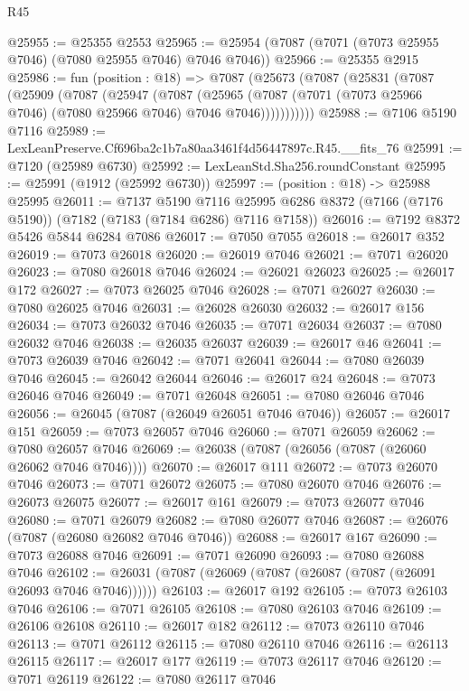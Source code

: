 \begin{lexlean}{R45}
\begin{coremodule}
{@25955 := @25355 @2553
@25965 := @25954 (@7087 (@7071 (@7073 @25955 @7046) (@7080 @25955 @7046) @7046 @7046))
@25966 := @25355 @2915
@25986 := fun (position : @18) =>
  @7087
    (@25673
      (@7087
        (@25831
          (@7087
            (@25909
              (@7087
                (@25947
                  (@7087
                    (@25965
                      (@7087 (@7071 (@7073 @25966 @7046) (@7080 @25966 @7046) @7046 @7046)))))))))))
@25988 := @7106 @5190 @7116
@25989 := LexLeanPreserve.Cf696ba2c1b7a80aa3461f4d56447897c.R45.__fits_76
@25991 := @7120 (@25989 @6730)
@25992 := LexLeanStd.Sha256.roundConstant
@25995 := @25991 (@1912 (@25992 @6730))
@25997 := (position : @18) -> @25988 @25995
@26011 := @7137
    @5190
    @7116
    @25995
    @6286
    @8372
    (@7166 (@7176 @5190))
    (@7182 (@7183 (@7184 @6286) @7116 @7158))
@26016 := @7192 @8372 @5426 @5844 @6284 @7086
@26017 := @7050 @7055
@26018 := @26017 @352
@26019 := @7073 @26018
@26020 := @26019 @7046
@26021 := @7071 @26020
@26023 := @7080 @26018 @7046
@26024 := @26021 @26023
@26025 := @26017 @172
@26027 := @7073 @26025 @7046
@26028 := @7071 @26027
@26030 := @7080 @26025 @7046
@26031 := @26028 @26030
@26032 := @26017 @156
@26034 := @7073 @26032 @7046
@26035 := @7071 @26034
@26037 := @7080 @26032 @7046
@26038 := @26035 @26037
@26039 := @26017 @46
@26041 := @7073 @26039 @7046
@26042 := @7071 @26041
@26044 := @7080 @26039 @7046
@26045 := @26042 @26044
@26046 := @26017 @24
@26048 := @7073 @26046 @7046
@26049 := @7071 @26048
@26051 := @7080 @26046 @7046
@26056 := @26045 (@7087 (@26049 @26051 @7046 @7046))
@26057 := @26017 @151
@26059 := @7073 @26057 @7046
@26060 := @7071 @26059
@26062 := @7080 @26057 @7046
@26069 := @26038 (@7087 (@26056 (@7087 (@26060 @26062 @7046 @7046))))
@26070 := @26017 @111
@26072 := @7073 @26070 @7046
@26073 := @7071 @26072
@26075 := @7080 @26070 @7046
@26076 := @26073 @26075
@26077 := @26017 @161
@26079 := @7073 @26077 @7046
@26080 := @7071 @26079
@26082 := @7080 @26077 @7046
@26087 := @26076 (@7087 (@26080 @26082 @7046 @7046))
@26088 := @26017 @167
@26090 := @7073 @26088 @7046
@26091 := @7071 @26090
@26093 := @7080 @26088 @7046
@26102 := @26031 (@7087 (@26069 (@7087 (@26087 (@7087 (@26091 @26093 @7046 @7046))))))
@26103 := @26017 @192
@26105 := @7073 @26103 @7046
@26106 := @7071 @26105
@26108 := @7080 @26103 @7046
@26109 := @26106 @26108
@26110 := @26017 @182
@26112 := @7073 @26110 @7046
@26113 := @7071 @26112
@26115 := @7080 @26110 @7046
@26116 := @26113 @26115
@26117 := @26017 @177
@26119 := @7073 @26117 @7046
@26120 := @7071 @26119
@26122 := @7080 @26117 @7046
}
\end{coremodule}
\end{lexlean}
